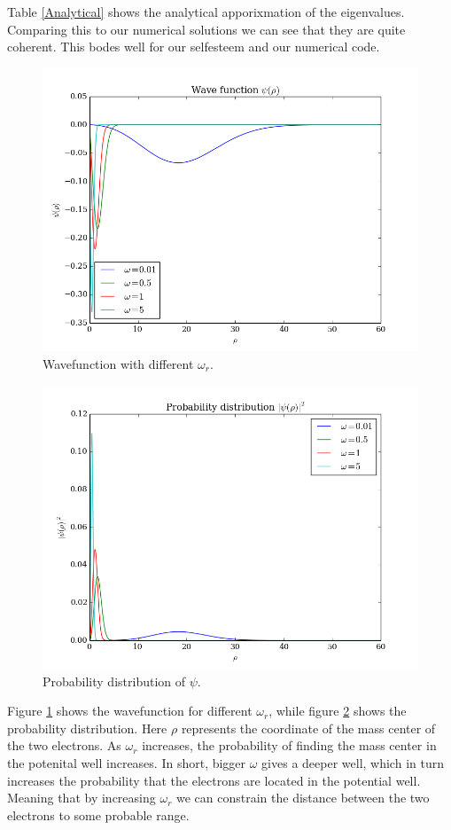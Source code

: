 \documentclass{aa}   %
\begin{document}
Table \ref{Analytical} shows the analytical apporixmation of the eigenvalues. Comparing this to our numerical solutions we can see that they are quite coherent. This bodes well for our selfesteem and our numerical code.

\begin{figure}
 \includegraphics[width=.49\textwidth]{wave_func2.png}
\caption{Wavefunction with different $\omega_r$.}
 \label{wave_func}
 \end{figure}

\begin{figure}
 \includegraphics[width=.49\textwidth]{probability_func2.png}
\caption{Probability distribution of $\psi$.}
 \label{probability_func}
 \end{figure}

Figure \ref{wave_func} shows the wavefunction for different $\omega_r$, while figure \ref{probability_func} shows the probability distribution. Here $\rho$ represents the coordinate of the mass center of the two electrons. As $\omega_r$ increases, the probability of finding the mass center in the potenital well increases. In short, bigger $\omega$ gives a deeper well, which in turn increases the probability that the electrons are located in the potential well. Meaning that by increasing $\omega_r$ we can constrain the distance between the two electrons to some probable range.
\end{document}

